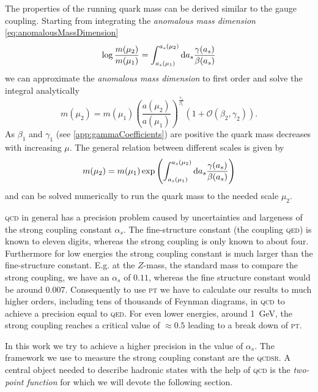 \documentclass[../../index.tex]{subfiles}
\begin{document}
The properties of the running quark mass can be derived similar to the gauge
coupling. Starting from integrating the \textit{anomalous mass dimension}
\cref{eq:anomalousMassDimension}
\begin{equation}
  \log \frac{m(\mu_2)}{m(\mu_1)} = \int_{a_s(\mu_1)}^{a_s(\mu_2)} \dif a_s \frac{\gamma(a_s)}{\beta(a_s)}
\end{equation}
we can approximate the \textit{anomalous mass dimension} to first order and
solve the integral analytically \cite{Schwab2002}
\begin{equation}
  m(\mu_2) = m(\mu_1)\left( \frac{a(\mu_2)}{a(\mu_1)} \right)^{\frac{\gamma_1}{\beta_1}} \left( 1 + \mathcal{O}(\beta_2, \gamma_2) \right).
\end{equation}
As $\beta_1$ and $\gamma_1$ (see \ref{app:gammaCoefficients}) are positive the
quark mass decreases with increasing $\mu$. The general relation between
different scales is given by
\begin{equation}
  m(\mu_2) = m(\mu_1) \exp \left( \int_{a_s(\mu_1)}^{a_s(\mu_2)} \dif a_s \frac{\gamma(a_s)}{\beta(a_s)}  \right)
\end{equation}
and can be solved numerically to run the quark mass to the needed scale $\mu_2$.

\textsc{qcd} in general has a precision problem caused by uncertainties and
largeness of the strong coupling constant $\alpha_s$. The fine-structure
constant (the coupling \textsc{qed}) is known to eleven digits, whereas the
strong coupling is only known to about four. Furthermore for low energies the
strong coupling constant is much larger than the fine-structure constant. E.g.
at the $Z$-mass, the standard mass to compare the strong coupling, we have an
$\alpha_s$ of $0.11$, whereas the fine structure constant would be around
$0.007$. Consequently to use \textsc{pt} we have to calculate our results to
much higher orders, including tens of thousands of Feynman diagrams, in
\textsc{qcd} to achieve a precision equal to \textsc{qed}. For even lower
energies, around \SI{1}{\giga\eV}, the strong coupling reaches a critical value
of $\approx 0.5$ leading to a break down of \textsc{pt}.

In this work we try to achieve a higher precision in the value of $\alpha_s$.
The framework we use to measure the strong coupling constant are the
\textsc{qcdsr}. A central object needed to describe hadronic states with the
help of \textsc{qcd} is the \textit{two-point function} for which we will devote
the following section.
\end{document}
